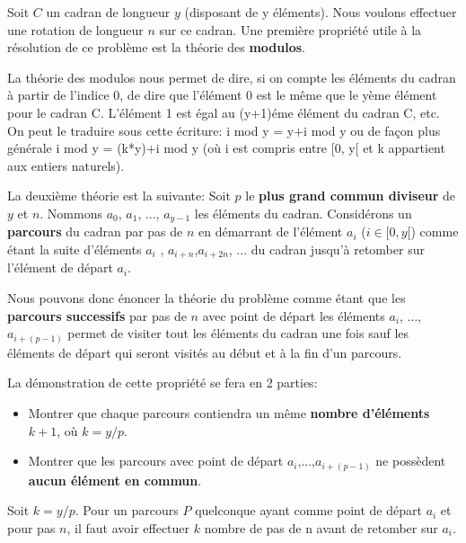 \documentclass[a4paper, 12pt]{report}
\begin{document}
Soit $C$ un cadran de longueur $y$ (disposant de y éléments). Nous voulons effectuer une rotation de  longueur $n$ sur ce cadran. Une première propriété utile à la résolution de ce problème est la théorie des \textbf{modulos}. \newline

La théorie des modulos nous permet de dire, si on compte les éléments du cadran à partir de l'indice 0, de dire que l'élément 0 est le même que le yème élément pour le cadran C. L'élément 1 est égal au (y+1)éme élément du cadran C, etc. On peut le traduire sous cette écriture:\newline
i mod y = y+i mod y ou de façon plus générale \newline
i mod y = (k*y)+i mod y (où i est compris entre [0, y[ et k appartient aux entiers naturels). \newline

La deuxième théorie est la suivante:\newline
Soit $p$ le \textbf{plus grand commun diviseur} de $y$ et $n$. Nommons $a_{0}$, $a_{1}$, ..., $a_{y-1}$ les éléments du cadran. Considérons un \textbf{parcours} du cadran par pas de $n$ en démarrant de l'élément $a_{i}$ ($i \in [0,y[$) comme étant la suite d'éléments $a_{i}$ , $a_{i+n}$,$a_{i+2n}$, ... du cadran jusqu'à retomber sur l'élément de départ $a_{i}$. \newline

Nous pouvons donc énoncer la théorie du problème comme étant que les \textbf{parcours successifs} par pas de $n$ avec point de départ les éléments  $a_{i}$, ..., $a_{i+(p-1)}$ permet de visiter tout les éléments du cadran une fois sauf les éléments de départ qui seront visités au début et à la fin d'un parcours.\newline

La démonstration de cette propriété se fera en 2 parties:
\begin{itemize}
\item Montrer que chaque parcours contiendra un même \textbf{nombre d'éléments} $k+1$, où $k = y/p$.
\item Montrer que les parcours avec point de départ $a_{i}$,...,$a_{i+(p-1)}$ ne possèdent \textbf{aucun élément en commun}.\newline
\end{itemize}

Soit $k = y/p$. Pour un parcours $P$ quelconque ayant comme point de départ $a_{i}$ et pour pas $n$, il faut avoir effectuer $k$ nombre de pas de n avant de retomber sur $a_{i}$. \newline
\end{document}

